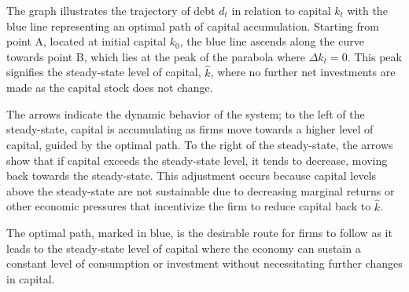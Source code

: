 \documentclass[12pt]{article}
\begin{document}
The graph illustrates the trajectory of debt \( d_t \) in relation to capital \( k_t \) with the blue line representing
an optimal path of capital accumulation. Starting from point A, located at initial capital \( k_0 \), the blue line
ascends along the curve towards point B, which lies at the peak of the parabola where \( \Delta k_t = 0 \). This peak
signifies the steady-state level of capital, \( \hat{k} \), where no further net investments are made as the capital
stock does not change. 

The arrows indicate the dynamic behavior of the system; to the left of the steady-state, capital is accumulating as
firms move towards a higher level of capital, guided by the optimal path. To the right of the steady-state, the arrows
show that if capital exceeds the steady-state level, it tends to decrease, moving back towards the steady-state. This
adjustment occurs because capital levels above the steady-state are not sustainable due to decreasing marginal returns
or other economic pressures that incentivize the firm to reduce capital back to \( \hat{k} \). 

The optimal path, marked in blue, is the desirable route for firms to follow as it leads to the steady-state level of
capital where the economy can sustain a constant level of consumption or investment without necessitating further
changes in capital. 


    

\end{document}
